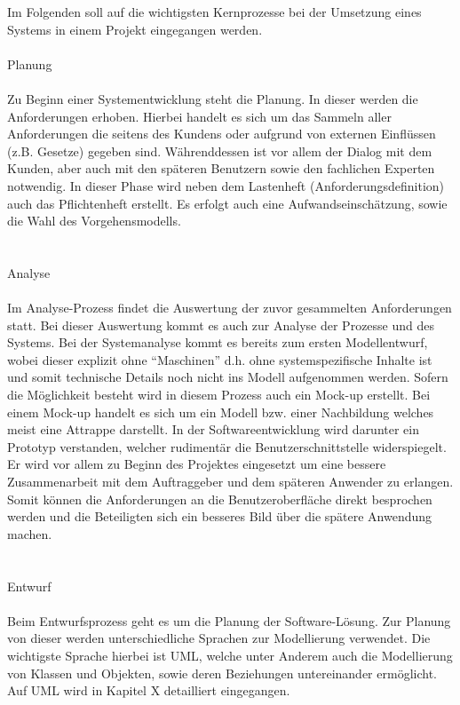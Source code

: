 Im Folgenden soll auf die wichtigsten Kernprozesse bei der Umsetzung eines Systems in einem Projekt eingegangen werden.\\
\\
Planung\\
\\
Zu Beginn einer Systementwicklung steht die Planung. In dieser werden die Anforderungen erhoben. Hierbei handelt es sich um das Sammeln aller Anforderungen die seitens des Kundens oder aufgrund von externen Einflüssen (z.B. Gesetze) gegeben sind. Währenddessen ist vor allem der Dialog mit dem Kunden, aber auch mit den späteren Benutzern sowie den fachlichen Experten notwendig. In dieser Phase wird neben dem Lastenheft (Anforderungsdefinition) auch das Pflichtenheft erstellt. Es erfolgt auch eine Aufwandseinschätzung, sowie die Wahl des Vorgehensmodells.\\
\\
\\
Analyse\\
\\
Im Analyse-Prozess findet die Auswertung der zuvor gesammelten Anforderungen statt. Bei dieser Auswertung kommt es auch zur Analyse der Prozesse und des Systems. Bei der Systemanalyse kommt es bereits zum ersten Modellentwurf, wobei dieser explizit ohne “Maschinen” d.h. ohne systemspezifische Inhalte ist und somit technische Details noch nicht ins Modell aufgenommen werden. Sofern die Möglichkeit besteht wird in diesem Prozess auch ein Mock-up erstellt. Bei einem Mock-up handelt es sich um ein Modell bzw. einer Nachbildung welches meist eine Attrappe darstellt. In der Softwareentwicklung wird darunter ein Prototyp verstanden, welcher rudimentär die Benutzerschnittstelle widerspiegelt. Er wird vor allem zu Beginn des Projektes eingesetzt um eine bessere Zusammenarbeit mit dem Auftraggeber und dem späteren Anwender zu erlangen. Somit können die Anforderungen an die Benutzeroberfläche direkt besprochen werden und die Beteiligten sich ein besseres Bild über die spätere Anwendung machen.\\
\\
\\
Entwurf\\
\\
Beim Entwurfsprozess geht es um die Planung der Software-Lösung. Zur Planung von dieser werden unterschiedliche Sprachen zur Modellierung verwendet. Die wichtigste Sprache hierbei ist UML, welche unter Anderem auch die Modellierung von Klassen und Objekten, sowie deren Beziehungen untereinander ermöglicht. Auf UML wird in Kapitel X detailliert eingegangen.
